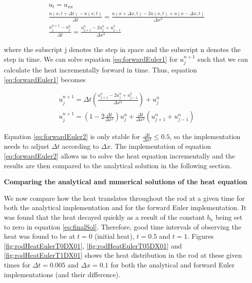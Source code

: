 \documentclass[12pt,a4paper]{article}
\begin{document}
\begin{equation}\label{eq:forwardEuler1}
\begin{aligned}
u_t = u_{xx}
\\
\frac{u(x,t+\Delta t) - u(x,t)}{\Delta t} = \frac{u(x+\Delta x, t)-2u(x,t)+u(x-\Delta x,t)}{\Delta x^2}
\\
\frac{u_j^{n+1}-u_j^n}{\Delta t} = \frac{u_{j+1}^n - 2u_j^n + u_{j-1}^2}{\Delta x^2}
\end{aligned}
\end{equation}

\noindent where the subscript j denotes the step in space and the subscript n denotes the step in time. We can solve equation \ref{eq:forwardEuler1} for $u_j^{n+1}$ such that we can calculate the heat incrementally forward in time. Thus, equation \ref{eq:forwardEuler1} becomes

\begin{equation}\label{eq:forwardEuler2}
\begin{aligned}
u_j^{n+1} = \Delta t(\frac{u_{j+1}^n - 2u_j^n + u_{j-1}^2}{\Delta x^2})+u_j^n
\\
u_j^{n+1} = (1-2\frac{\Delta t}{\Delta x^2})u_j^n + \frac{\Delta t}{\Delta x^2}(u_{j+1}^n + u_{j-1}^n)
\end{aligned}
\end{equation}

\noindent Equation \ref{eq:forwardEuler2} is only stable for $\frac{\Delta t}{\Delta x^2} \leq 0.5$, so the implementation needs to adjust $\Delta t$ according to $\Delta x$. The implementation of equation \ref{eq:forwardEuler2} allows us to solve the heat equation incrementally and the results are then compared to the analytical solution in the following section.

\begin{center}
\large{\textbf{Comparing the analytical and numerical solutions of the heat equation}}
\end{center}

\noindent We now compare how the heat translates throughout the rod at a given time for both the analytical implementation and for the forward Euler implementation. It was found that the heat decayed quickly as a result of the constant $b_n$ being set to zero in equation \ref{eq:finalSol}. Therefore, good time intervals of observing the heat was found to be at $t = 0$ (initial heat), $t = 0.5$ and $t = 1$. Figures \ref{fig:rodHeatEulerT0DX01}, \ref{fig:rodHeatEulerT05DX01} and \ref{fig:rodHeatEulerT1DX01} shows the heat distribution in the rod at these given times for $\Delta t = 0.005$ and $\Delta x = 0.1$ for both the analytical and forward Euler implementations (and their difference).
\end{document}
